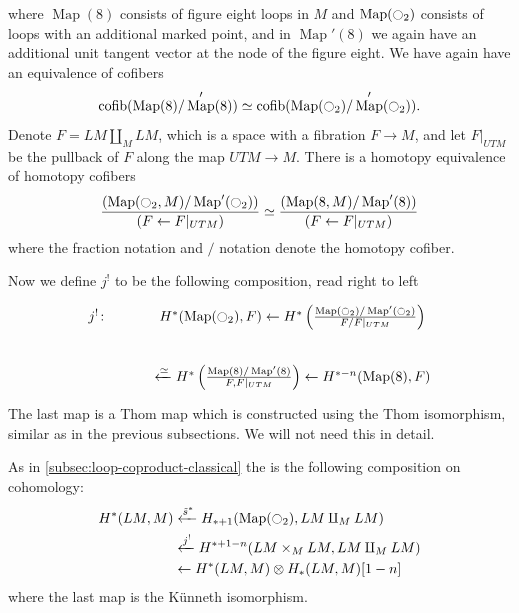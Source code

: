 \documentclass{scrartcl}
\let\emph\relax
\theoremstyle{plain}
\theoremstyle{definition}
\DeclareMathOperator{\cofib}{cofib}
\newcommand{\quiso}{\simeq}
\newcommand{\from}{\leftarrow}
\let\xfrom\xleftarrow
\DeclareMathOperator{\Map}{Map}
\renewcommand{\coprod}{\mathbin{\amalg}}
\begin{document}
where $\Map(8)$ consists of figure eight loops in $M$ and $\Map(\ocircle_2)$ consists of loops with an additional marked point, and in $\Map'(8)$ we again have an additional unit tangent vector at the node of the figure eight. 
We have again have an equivalence of cofibers $$\cofib(\Map(8) / \Map'(8)) \quiso \cofib(\Map(\ocircle_2)/\Map'(\ocircle_2)).$$ Denote $F = LM\coprod_M LM$, which is a space with a fibration $F\to M$, and let $F|_{UTM}$ be the pullback of $F$ along the map $UTM\to M$. There is a homotopy equivalence of homotopy cofibers
\begin{align*}
    \frac{(\Map(\ocircle_2,M) / \Map'(\ocircle_2))} {(F\from F|_{UTM}) } \quiso \frac{(\Map(8,M) / \Map'(8)) }{(F\from F|_{UTM})}
\end{align*}
where the fraction notation and $/$ notation denote the homotopy cofiber. 

Now we define $j^!$ to be the following composition, read right to left
\[
\begin{tikzcd}
    j^!\colon &H^*(\Map(\ocircle_2), F) \from H^*\left(\frac{\Map(\ocircle_2) / \Map'(\ocircle_2)} {F / F|_{UTM}}\right) \\ &\xfrom{\quiso} H^*\left(\frac{\Map(8) / \Map'(8)} {F, F|_{UTM}}\right) \from H^{*-n}(\Map(8), F)
\end{tikzcd}
\]
The last map is a Thom map which is constructed using the Thom isomorphism, similar as in the previous subsections. We will not need this in detail.

As in \cref{subsec:loop-coproduct-classical} the \emph{Loop Coproduct} is the following composition on cohomology:
\begin{align*}
    H^*(LM, M) &\xfrom{\tilde s^*} H_{*+1}(\Map(\ocircle_2), LM\coprod_M LM) \\ &\xfrom{j^!} H^{*+1-n}(LM\times_M LM, LM\coprod_M LM) \\ &\from H^{*}(LM, M)\otimes H_*(LM, M)[1-n]
\end{align*}
where the last map is the Künneth isomorphism.
\end{document}
